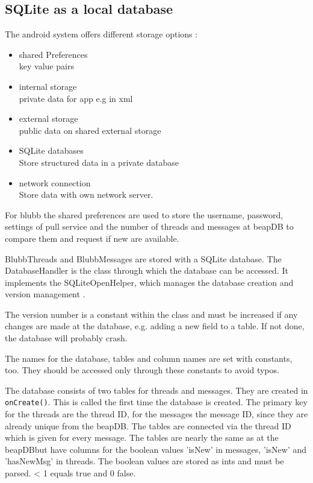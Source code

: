\documentclass[12pt,a4paper,oneside]{report}
\newcommand{\appname}{blubb}
\newcommand{\beapDB}{beapDB}
\newcommand{\code}[1]{\lstinline{#1}}
\begin{document}
\subsection{SQLite as a local database}

The android system offers different storage options \citep{aDefStorageOpt}:
\begin{itemize}
\item{shared Preferences \\key value pairs}
\item{internal storage \\private data for app e.g in xml}
\item{external storage \\public data on shared external storage}
\item{SQLite databases \\Store structured data in a private database}
\item{network connection \\Store data with own network server.}
\end{itemize}
 
For \appname{} the shared preferences are used to store the username, password, settings of pull service and the number of threads and messages at \beapDB{} to compare them and request if new are available.

BlubbThreads and BlubbMessages are stored with a SQLite database. 
The DatabaseHandler is the class through which the database can be accessed. It implements the SQLiteOpenHelper, which manages the database creation and version management \citep{aDefSQLiteOpenHelper}.

The version number is a constant within the class and must be increased if any changes are made at the database, e.g. adding a new field to a table. If not done, the database will probably crash.


The names for the database, tables and column names are set with constants, too. They should be accessed only through these constants to avoid typos. 


The database consists of two tables for threads and messages.
They are created in \code{onCreate()}. This is called the first time the database is created. The primary key for the threads are the thread ID, for the messages the message ID, since they are already unique from the \beapDB{}. The tables are connected via the thread ID which is given for every message.
The tables are nearly the same as at the \beapDB but have columns for the boolean values 'isNew' in messages, 'isNew' and 'hasNewMsg' in threads. The boolean values are stored as ints and must be parsed. < 1 equals true and 0 false. 
\end{document}

